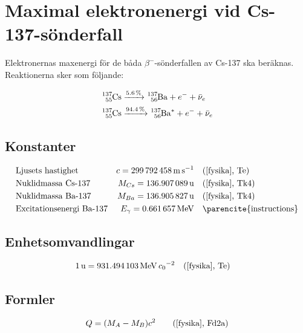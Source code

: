 \section{Maximal elektronenergi vid Cs-137-sönderfall} \label{sec:energy}

Elektronernas maxenergi för de båda $\beta^-$-sönderfallen av Cs-137 ska
beräknas. Reaktionerna sker som följande:

\begin{align}
    \ce{^137_55Cs} &\xrightarrow{\qty{5.6}{\percent}}  \ce{^137_56Ba} + e^- + \bar{\nu}_e   \label{csdecay1} \\
    \ce{^137_55Cs} &\xrightarrow{\qty{94.4}{\percent}} \ce{^137_56Ba^*} + e^- + \bar{\nu}_e \label{csdecay2}
\end{align}

\subsection{Konstanter}

\begin{align*}
    & \text{Ljusets hastighet}        & c        = \qty{299792458}{\m\per\s}         &\quad \text{(\cite{fysika}, Te)}   \\
    & \text{Nuklidmassa Cs-137}       & M_{Cs}   = \qty{136.907089}{\atomicmassunit} &\quad \text{(\cite{fysika}, Tk4)}  \\
    & \text{Nuklidmassa Ba-137}       & M_{Ba}   = \qty{136.905827}{\atomicmassunit} &\quad \text{(\cite{fysika}, Tk4)}  \\
    & \text{Excitationsenergi Ba-137} & E_\gamma = \qty{0.661657}{\MeV}              &\quad \text{\parencite{instructions}}
\end{align*}

\subsection{Enhetsomvandlingar}

\begin{align*}
    & \qty{1}{\atomicmassunit} = \qty{931.494103}{\MeV\per\clight\squared} \quad \text{(\cite{fysika}, Te)}
\end{align*}

\subsection{Formler}

\begin{align}
    Q &= (M_A - M_B)c^2 &\quad \text{(\cite{fysika}, Fd2a)} \label{freed}
\end{align}

